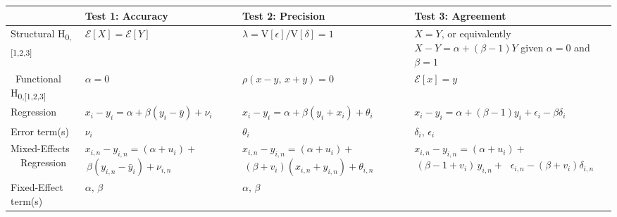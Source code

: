 \begingroup
\renewcommand{\arraystretch}{1.5}
\begin{table}[h]
    \centering
    \begin{tabular}{|
    >{\raggedright\arraybackslash}p{89.3601pt}|| %
    >{\centering\arraybackslash}p{110.1879pt}|  %
    >{\centering\arraybackslash}p{112.1489pt}|  %
    >{\centering\arraybackslash}p{132.08827pt}| %
}\hline
         & Test 1: Accuracy & Test 2: Precision & Test 3: Agreement \\\hline\hline
        Structural H\textsubscript{0,[1,2,3]}
            & $\mathcal{E}[X]=\mathcal{E}[Y]$
            & $\lambda=\text{V}[\epsilon]/\text{V}[\delta]=1$
            & \makecell[c]{$X=Y$, or equivalently \\ $X-Y=\alpha+(\beta-1)Y$ \\ given $\alpha=0$ and $\beta=1$} \\\arrayrulecolor{lightgray}\hline\
        Functional H\textsubscript{0,[1,2,3]}
            & $\alpha=0$
            & $\rho(x-y,\,x+y)=0$
            & $\mathcal{E}[x]=y$ \\\arrayrulecolor{lightgray}\hline
        Regression
            & $x_i - y_i = \alpha + \beta(y_i - \bar{y}) + \nu_i$
            & $x_i - y_i = \alpha + \beta(y_i + x_i) + \theta_i$
            & $x_i - y_i = \alpha + (\beta - 1)y_i + \epsilon_i - \beta\delta_i$
            \\\arrayrulecolor{lightgray}\hline
        Error term(s)
            & $\nu_i$
            & $\theta_i$
            & $\delta_i,\,\epsilon_i$ \\\arrayrulecolor{black}\hline\hline
        \makecell[l]{Mixed-Effects \\ \ \ Regression}
            & \makecell[c]{$x_{i,n} - y_{i,n} = (\alpha + u_i) +$ \\
                           $\, \beta(y_{i,n} - \bar{y}_i) + \nu_{i,n}$}
            & \makecell[c]{$x_{i,n} - y_{i,n} = (\alpha + u_i) +$ \\
                           $\,(\beta + v_i)(x_{i,n} + y_{i,n}) + \theta_{i,n}$}
            & \makecell[c]{$x_{i,n} - y_{i,n} = (\alpha + u_i) +$ \\
                           $\,(\beta - 1 + v_i)\,y_{i,n} +$ \\
                           $\;\epsilon_{i,n} - (\beta+v_i)\delta_{i,n}$} \\\arrayrulecolor{lightgray}\hline
        Fixed-Effect term(s)
            & $\alpha,\,\beta$
            & $\alpha,\,\beta$

\end{tabular}
\end{table}
